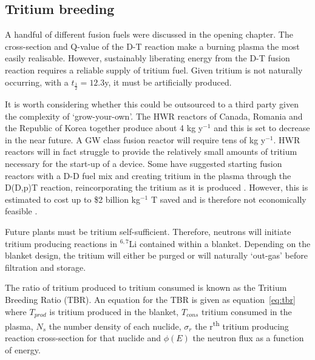 \FloatBarrier
\subsection{Tritium breeding}
A handful of different fusion fuels were discussed in the opening chapter. The cross-section and Q-value of the D-T reaction make a burning plasma the most easily realisable. However, sustainably liberating energy from the D-T fusion reaction requires a reliable supply of tritium fuel. Given tritium is not naturally occurring, with a $t_{\frac{1}{2}}=12.3$y, it must be artificially produced. 

It is worth considering whether this could be outsourced to a third party given the complexity of `grow-your-own'. The HWR reactors of Canada, Romania and the Republic of Korea together produce about 4 kg y$^{-1}$ and this is set to decrease in the near future. A GW class fusion reactor will require tens of kg y$^{-1}$. HWR reactors will in fact struggle to provide the relatively small amounts of tritium necessary for the start-up of a device. Some have suggested starting fusion reactors with a D-D fuel mix and creating tritium in the plasma through the D(D,p)T reaction, reincorporating the tritium as it is produced \cite{Zheng2016}. However, this is estimated to cost up to \$2 billion kg$^{-1}$ T saved and is therefore not economically feasible \cite{Kovari2018}. 

Future plants must be tritium self-sufficient. Therefore, neutrons will initiate tritium producing reactions in $^{6,7}$Li contained within a blanket. Depending on the blanket design, the tritium will either be purged or will naturally `out-gas' before filtration and storage. 


The ratio of tritium produced to tritium consumed is known as the Tritium Breeding Ratio (TBR). An equation for the TBR is given as equation~\ref{eq:tbr} where $T_{prod}$ is tritium produced in the blanket, $T_{cons}$ tritium consumed in the plasma, $N_{s}$ the number density of each nuclide, $\sigma_{r}$ the r\textsuperscript{th} tritium producing reaction cross-section for that nuclide and $\phi(E)$ the neutron flux as a function of energy. 

